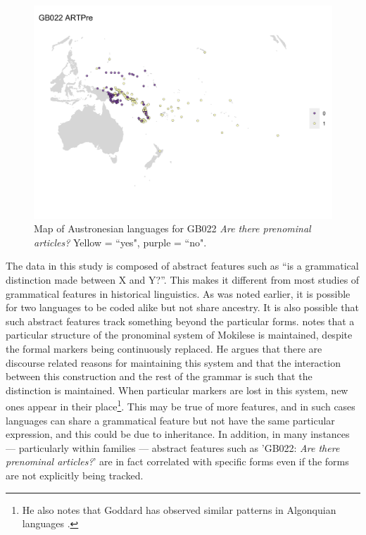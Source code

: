\documentclass[a4paper,10pt]{article} %
\begin{document}
\begin{figure}
\centering
\includegraphics[width=20cm]{illustrations/plots_from_R/coverage_plots/maps/map_GB022.png}
\caption{{Map of Austronesian languages for GB022 \emph{Are there prenominal articles?} Yellow = ``yes", purple = ``no".}}
\label{fig:gb022_map}
\end{figure}

The data in this study is composed of abstract features such as ``is a grammatical distinction made between X and Y?''. This makes it different from most studies of grammatical features in historical linguistics. As was noted earlier, it is possible for two languages to be coded alike but not share ancestry. It is also possible that such abstract features track something beyond the particular forms. \citet[503]{ross2004morphosyntactic} notes that a particular structure of the pronominal system of Mokilese is maintained, despite the formal markers being continuously replaced. He argues that there are discourse related reasons for maintaining this system and that the interaction between this construction and the rest of the grammar is such that the distinction is maintained. When particular markers are lost in this system, new ones appear in their place\footnote{He also notes that Goddard has observed similar patterns in Algonquian languages \citep{goddard1993algonquian}.}. This may be true of more features, and in such cases languages can share a grammatical feature but not have the same particular expression, and this could be due to inheritance. In addition, in many instances --- particularly within families --- abstract features such as 'GB022: \emph{Are there prenominal articles?}' are in fact correlated with specific forms even if the forms are not explicitly being tracked.
\end{document}
